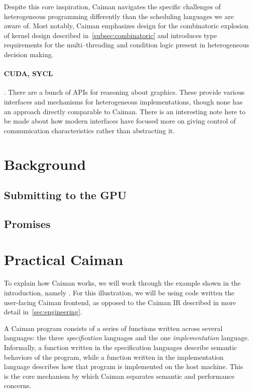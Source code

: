 Despite this core inspiration, Caiman navigates the specific challenges of heterogeneous programming differently than the scheduling languages we are aware of.   Most notably, Caiman emphasizes design for the combinatoric explosion of kernel design described in~\ref{subsec:combinatoric} and introduces type requirements for the multi--threading and condition logic present in heterogeneous decision making.

\paragraph{CUDA, SYCL}

.  There are a bunch of APIs for reasoning about graphics.  These provide various interfaces and mechanisms for heterogeneous implementations, though none has an approach directly comparable to Caiman.  There is an interesting note here to be made about how modern interfaces have focused more on giving control of communication characteristics rather than abstracting it.

\section{Background}
\label{sec:background}

\subsection{Submitting to the GPU}
\label{subsec:submission}

\subsection{Promises}
\label{subsec:promise}

\section{Practical Caiman}
\label{sec:practical}

To explain how Caiman works, we will work through the example shown in the introduction, namely .  For this illustration, we will be using code written the user-facing Caiman frontend, as opposed to the Caiman IR described in more detail in~\ref{sec:engineering}.

A Caiman program consists of a series of functions written across several languages: the three \textit{specification} languages and the one \textit{implementation} language.  Informally, a function written in the specification languages describe semantic behaviors of the program, while a function written in the implementation language describes how that program is implemented on the host machine.  This is the core mechanism by which Caiman separates semantic and performance concerns.

